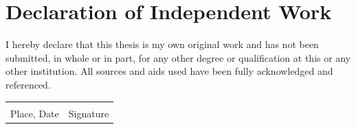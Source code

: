 \documentclass[12pt, a4paper, twoside]{report}
\begin{document}


\chapter*{Declaration of Independent Work}
I hereby declare that this thesis is my own original work and has not been submitted, in whole or in part, for any other degree or qualification at this or any other institution. All sources and aids used have been fully acknowledged and referenced.

\vspace{2cm}
\noindent
\begin{tabular}{@{}p{6cm}p{6cm}@{}}
\hrulefill & \hrulefill \\
Place, Date & Signature
\end{tabular}
\end{document}
